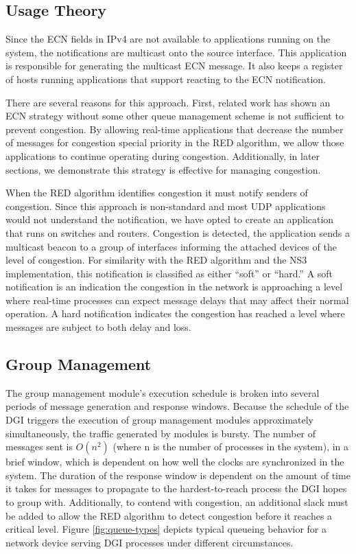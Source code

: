 \subsection{Usage Theory}
Since the \ac{ECN} fields in IPv4 are not available to applications running on the system, the notifications are multicast onto the source interface.
This application is responsible for generating the multicast ECN message.
It also keeps a register of hosts running applications that support reacting to the \ac{ECN} notification.

There are several reasons for this approach.
First, related work has shown an \ac{ECN} strategy without some other queue management scheme is not sufficient to prevent congestion.
By allowing real-time applications that decrease the number of messages for congestion special priority in the \ac{RED} algorithm, we allow those applications to continue operating during congestion.
Additionally, in later sections, we demonstrate this strategy is effective for managing congestion.

When the \ac{RED} algorithm identifies congestion it must notify senders of congestion.
Since this approach is non-standard and most UDP applications would not understand the notification, we have opted to create an application that runs on switches and routers.
Congestion is detected, the application sends a multicast beacon to a group of interfaces informing the attached devices of the level of congestion.
For similarity with the \ac{RED} algorithm and the \ac{NS3} implementation, this notification is classified as either ``soft'' or ``hard.''
A soft notification is an indication the congestion in the network is approaching a level where real-time processes can expect message delays that may affect their normal operation.
A hard notification indicates the congestion has reached a level where messages are subject to both delay and loss.

\subsection{Group Management}

The group management module's execution schedule is broken into several periods of message generation and response windows.
Because the schedule of the \ac{DGI} triggers the execution of group management modules approximately simultaneously, the traffic generated by modules is bursty.
The number of messages sent is $O(n^2)$ (where n is the number of processes in the system), in a brief window, which is dependent on how well the clocks are synchronized in the system.
The duration of the response window is dependent on the amount of time it takes for messages to propagate to the hardest-to-reach process the \ac{DGI} hopes to group with.
Additionally, to contend with congestion, an additional slack must be added to allow the \ac{RED} algorithm to detect congestion before it reaches a critical level.
Figure \ref{fig:queue-types} depicts typical queueing behavior for a network device serving \ac{DGI} processes under different circumstances.

